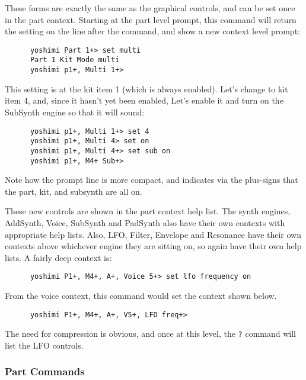   These forms are exactly the same as the graphical controls, and can be set
   once in the part context. Starting at the part level prompt, this command
   will return the setting on the line after the command, and show a new
   context level prompt:

   \begin{verbatim}
      yoshimi Part 1+> set multi
      Part 1 Kit Mode multi
      yoshimi p1+, Multi 1+>
   \end{verbatim}

   This setting is at the kit item 1 (which is always enabled).
   Let's change to kit item 4, and, since it hasn't yet been enabled,
   Let's enable it and turn on the SubSynth engine so that it will sound:

   \begin{verbatim}
      yoshimi p1+, Multi 1+> set 4
      yoshimi p1+, Multi 4> set on
      yoshimi p1+, Multi 4+> set sub on
      yoshimi p1+, M4+ Sub+>
   \end{verbatim}

   Note how the prompt line is more compact, and indicates via the plus-signs
   that the part, kit, and subsynth are all on.

   These new controls are shown in the part context help list.
   The synth engines, AddSynth, Voice, SubSynth and PadSynth also have their
   own contexts with appropriate help lists.
   Also, LFO, Filter, Envelope and Resonance have their own contexts above
   whichever engine they are sitting on, so again have their own help lists.
   A fairly deep context is:

   \begin{verbatim}
      yoshimi P1+, M4+, A+, Voice 5+> set lfo frequency on
   \end{verbatim}

   From the voice context, this command would set the context shown below.

   \begin{verbatim}
      yoshimi P1+, M4+, A+, V5+, LFO freq+>
   \end{verbatim}

   The need for compression is obvious, and once at this level, the
   \texttt{?} command will list the LFO controls.

\subsubsection{Part Commands}
\label{subsec:command_line_part_commands}

